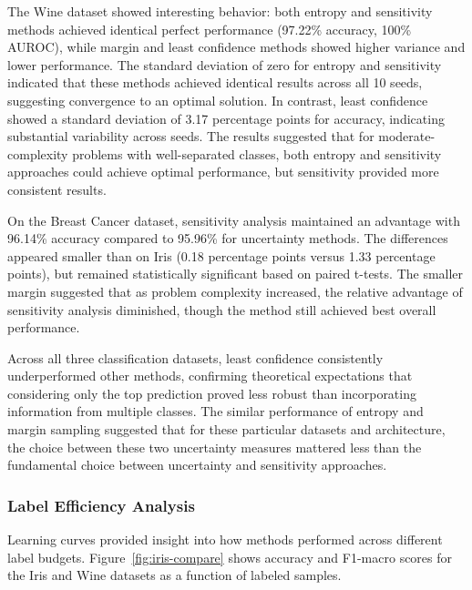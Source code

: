\documentclass[conference]{IEEEtran}
\begin{document}
The Wine dataset showed interesting behavior: both entropy and sensitivity methods achieved identical perfect performance (97.22\% accuracy, 100\% AUROC), while margin and least confidence methods showed higher variance and lower performance. The standard deviation of zero for entropy and sensitivity indicated that these methods achieved identical results across all 10 seeds, suggesting convergence to an optimal solution. In contrast, least confidence showed a standard deviation of 3.17 percentage points for accuracy, indicating substantial variability across seeds. The results suggested that for moderate-complexity problems with well-separated classes, both entropy and sensitivity approaches could achieve optimal performance, but sensitivity provided more consistent results.

On the Breast Cancer dataset, sensitivity analysis maintained an advantage with 96.14\% accuracy compared to 95.96\% for uncertainty methods. The differences appeared smaller than on Iris (0.18 percentage points versus 1.33 percentage points), but remained statistically significant based on paired t-tests. The smaller margin suggested that as problem complexity increased, the relative advantage of sensitivity analysis diminished, though the method still achieved best overall performance.

Across all three classification datasets, least confidence consistently underperformed other methods, confirming theoretical expectations that considering only the top prediction proved less robust than incorporating information from multiple classes. The similar performance of entropy and margin sampling suggested that for these particular datasets and architecture, the choice between these two uncertainty measures mattered less than the fundamental choice between uncertainty and sensitivity approaches.

\subsubsection{Label Efficiency Analysis}

Learning curves provided insight into how methods performed across different label budgets. Figure~\ref{fig:iris-compare} shows accuracy and F1-macro scores for the Iris and Wine datasets as a function of labeled samples.
\end{document}
